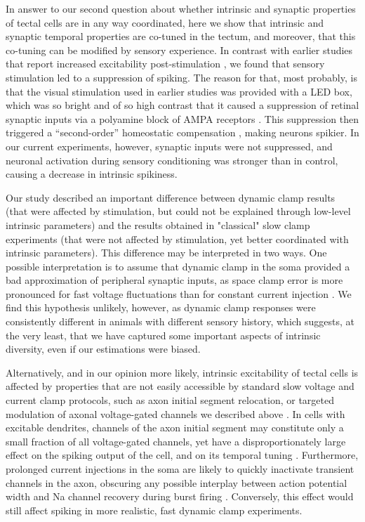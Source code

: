 \documentclass{article}
\begin{document}
In answer to our second question about whether intrinsic and synaptic properties of tectal cells are in any way coordinated, here we show that intrinsic and synaptic temporal properties are co-tuned in the tectum, and moreover, that this co-tuning can be modified by sensory experience. In contrast with earlier studies that report increased excitability post-stimulation \citep{aizenman2003,dong2009,ciarleglio2015}, we found that sensory stimulation led to a suppression of spiking. The reason for that, most probably, is that the visual stimulation used in earlier studies was provided with a LED box, which was so bright and of so high contrast that it caused a suppression of retinal synaptic inputs via a polyamine block of AMPA receptors \citep{aizenman2003}. This suppression then triggered a “second-order” homeostatic compensation \citep{turrigiano2011,tien2018}, making neurons spikier. In our current experiments, however, synaptic inputs were not suppressed, and neuronal activation during sensory conditioning was stronger than in control, causing a decrease in intrinsic spikiness.

Our study described an important difference between dynamic clamp results (that were affected by stimulation, but could not be explained through low-level intrinsic parameters) and the results obtained in "classical" slow clamp experiments (that were not affected by stimulation, yet better coordinated with intrinsic parameters). This difference may be interpreted in two ways. One possible interpretation is to assume that dynamic clamp in the soma provided a bad approximation of peripheral synaptic inputs, as space clamp error is more pronounced for fast voltage fluctuations than for constant current injection \citep{spruston1993,prinz2004}. We find this hypothesis unlikely, however, as dynamic clamp responses were consistently different in animals with different sensory history, which suggests, at the very least, that we have captured some important aspects of intrinsic diversity, even if our estimations were biased. 

Alternatively, and in our opinion more likely, intrinsic excitability of tectal cells is affected by properties that are not easily accessible by standard slow voltage and current clamp protocols, such as axon initial segment relocation, or targeted modulation of axonal voltage-gated channels we described above \citep{grubb2010activity,kole2012}. In cells with excitable dendrites, channels of the axon initial segment may constitute only a small fraction of all voltage-gated channels, yet have a disproportionately large effect on the spiking output of the cell, and on its temporal tuning \citep{kole2007,hamada2016}. Furthermore, prolonged current injections in the soma are likely to quickly inactivate transient channels in the axon, obscuring any possible interplay between action potential width and Na channel recovery during burst firing \citep{popovic2011,kole2012}. Conversely, this effect would still affect spiking in more realistic, fast dynamic clamp experiments.
\end{document}
